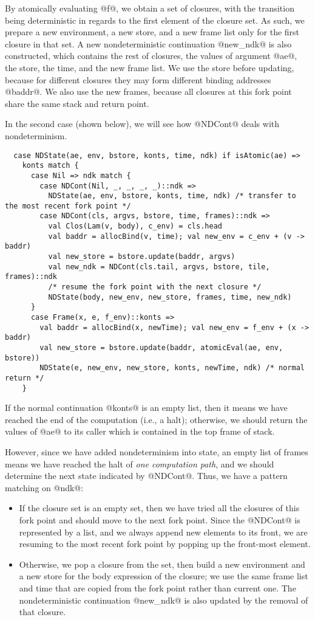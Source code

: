\documentclass[acmsmall, review]{acmart}\settopmatter{}
\begin{document}
By atomically evaluating @f@, we obtain a set of closures, with the transition being 
deterministic in regards to the first element of the closure set.
As such, we prepare a new environment, a new store, and a new frame list only for the
first closure in that set.
A new nondeterministic continuation @new_ndk@ is also constructed,
which contains the rest of closures, the values of argument @ae@, the store,
the time, and the new frame list.
We use the store before updating, because for different closures they may form
different binding addresses @baddr@.
We also use the new frames, because all closures at this fork point share
the same stack and return point.

In the second case (shown below), we will see how @NDCont@ deals with
nondeterminism.

\begin{lstlisting}
  case NDState(ae, env, bstore, konts, time, ndk) if isAtomic(ae) =>
    konts match {
      case Nil => ndk match {
        case NDCont(Nil, _, _, _, _)::ndk =>
          NDState(ae, env, bstore, konts, time, ndk) /* transfer to the most recent fork point */
        case NDCont(cls, argvs, bstore, time, frames)::ndk =>
          val Clos(Lam(v, body), c_env) = cls.head
          val baddr = allocBind(v, time); val new_env = c_env + (v -> baddr)
          val new_store = bstore.update(baddr, argvs)
          val new_ndk = NDCont(cls.tail, argvs, bstore, tile, frames)::ndk
          /* resume the fork point with the next closure */
          NDState(body, new_env, new_store, frames, time, new_ndk)
      }
      case Frame(x, e, f_env)::konts =>
        val baddr = allocBind(x, newTime); val new_env = f_env + (x -> baddr)
        val new_store = bstore.update(baddr, atomicEval(ae, env, bstore))
        NDState(e, new_env, new_store, konts, newTime, ndk) /* normal return */
    }
\end{lstlisting}

If the normal continuation @konts@ is an empty list, then it means we have reached
the end of the computation (i.e., a halt); otherwise, we should return the values of 
@ae@ to its caller which is contained in the top frame of stack.

However, since we have added nondeterminism into state, an empty list of frames means
we have reached the halt of \textit{one computation path}, and we should
determine the next state indicated by @NDCont@.
Thus, we have a pattern matching on @ndk@:
\begin{itemize}
  \item If the closure set is an empty set,
then we have tried all the closures of this fork point and should move to the
next fork point. Since the @NDCont@ is represented by a list, and we always
append new elements to its front, we are resuming to the most recent fork point by
popping up the front-most element.
  \item Otherwise, we pop a closure from the set, then build a new
environment and a new store for the body expression of the closure;
we use the same frame list and time that are copied from the fork point rather
than current one.
The nondeterministic continuation @new_ndk@ is also updated by the removal of that closure.
\end{itemize}
\end{document}
